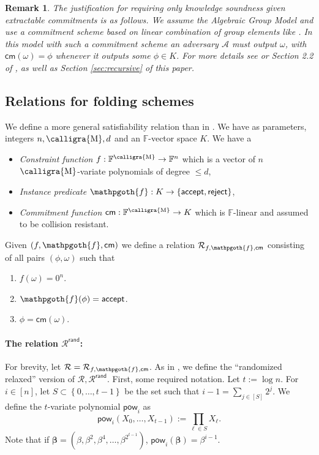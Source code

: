 \documentclass[11pt]{article} %
\newcommand{\F}{\ensuremath{\mathbb F}\xspace}
\newcommand{\adv}{\ensuremath{\mathcal A}\xspace}
\newcommand{\cm}{\ensuremath{\mathsf{cm}}\xspace}
\newcommand{\rej}{\ensuremath{\mathsf{reject}}\xspace}
\newcommand{\acc}{\ensuremath{\mathsf{accept}}\xspace}
\newcommand{\defeq}{:=}
\newcommand{\inst}{\ensuremath{\phi}\xspace}
\newcommand{\wit}{\ensuremath{\mathsf{\omega}}\xspace}
\newcommand{\rel}{\ensuremath{\mathcal{R}}\xspace}
\newcommand{\relrand}{\ensuremath{\mathcal{R^{\mathsf{rand}}}}\xspace}
\newcommand{\set}[1]{\ensuremath{\left\{#1\right\}}\xspace}
\newcommand{\sumj}[1]{\sum_{j\in[#1]}}
\newtheorem{remark}[lemma]{Remark}
\newcommand{\betaa}{\ensuremath{\mathbf{\boldsymbol{\beta}}}\xspace}
\newcommand{\pow}{\ensuremath{\mathsf{pow}}\xspace}
\newcommand{\predinst}{\ensuremath{\mathpgoth{f}}\xspace}
\newcommand{\calligmath}[1]{\ensuremath{\text{\calligra{#1}}}\xspace}
\newcommand{\M}{\calligmath{M}}
\begin{document}
\begin{remark}\label{rem:agm->ext commitments}
 The justification for requiring only knowledge soundness given extractable commitments is as follows.
 We assume the Algebraic Group Model \cite{agm} and use a commitment scheme based on linear combination of group elements like \cite{kate}.
 In this model with such a commitment scheme an adversary \adv must output \wit, with $\cm(\wit)=\inst$ whenever it outputs some $\inst\in K$.
 For more details see \cite{agm} or Section 2.2 of \cite{plonk}, as well as Section \ref{sec:recursive} of this paper.
\end{remark}

\subsection{Relations for folding schemes}
We define a more general satisfiability relation than in \cite{protogal}.
We have as parameters, integers $n,\M,d$ and an $\F$-vector space $K$.
We have a
\begin{itemize}
 \item \emph{Constraint function} $f:\F^\M\to \F^n$ which is a vector of $n$ $\M$-variate polynomials of degree $\leq d$,
\item \emph{Instance predicate} $\predinst:K \to \set{\acc,\rej}$,
\item \emph{Commitment function} $\cm:\F^\M \to K$ which is $\F$-linear and assumed
to be collision resistant.
\end{itemize}

Given $(f,\predinst,\cm)$ we define a relation $\rel_{f,\predinst,\cm}$ consisting of all pairs
$(\inst,\wit)$ such that
\begin{enumerate}
 \item $f(\wit)=0^n$.
 \item $\predinst(\inst)=\acc$.
 \item $\inst=\cm(\wit)$.
\end{enumerate}

\paragraph{The relation $\relrand$:}
 For brevity, let $\rel=\rel_{f,\predinst,\cm}$.
  As in \cite{protogal}, we define the ``randomized relaxed'' version of $\rel, \relrand$. First, some required notation.
 Let $t\defeq \log n$. For $i\in [n]$, let $S\subset \set{0,\ldots,t-1}$ be the set such that $i-1=\sumj{S}2^j$. We define the $t$-variate polynomial $\pow_i$ as
 \[\pow_i(X_0,\ldots,X_{t-1}) \defeq \prod_{\ell\in S} X_\ell.\]
 Note that if $\betaa=(\beta,\beta^2,\beta^4,\ldots,\beta^{2^{t-1}})$, $\pow_i(\betaa)=\beta^{i-1}$. 
  
\end{document}
